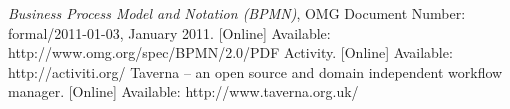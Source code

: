 \renewcommand{\bibname}{References}
\begin{thebibliography}{99}
 \textit{Business Process Model and Notation 
(BPMN)}, OMG Document Number: formal/2011-01-03, January 2011. [Online] Available: http://www.omg.org/spec/BPMN/2.0/PDF
 Activity. [Online] Available: http://activiti.org/
 Taverna -- an open source and domain independent workflow manager. [Online] Available: http://www.taverna.org.uk/
\end{thebibliography}

%    
%    
